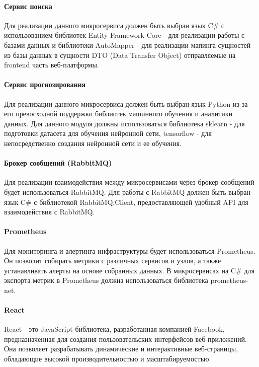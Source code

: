 \paragraph{Сервис поиска}

Для реализации данного микросервиса должен быть выбран язык C\# с использованием библиотек Entity Framework Core - для реализации работы с базами данных и библиотеки AutoMapper - для реализации мапинга сущностей из базы данных в сущности DTO (Data Transfer Object) отправляемые на frontend часть веб-платформы.

\paragraph{Сервис прогнозирования}

Для реализации данного микросервиса должен быть выбран язык Python из-за его превосходной поддержки библиотек машинного обучения и аналитики данных. Для данного модуля должны использоваться библиотека sklearn - для подготовки датасета для обучения нейронной сети, tensorflow - для непосредственно создания нейронной сети и ее обучения.

\paragraph{Брокер сообщений (RabbitMQ)}

Для реализации взаимодействия между микросервисами через брокер сообщений будет использоваться RabbitMQ. Для работы с RabbitMQ должен быть выбран язык C\# с библиотекой RabbitMQ.Client, предоставляющей удобный API для взаимодействия с RabbitMQ.

\paragraph{Prometheus}

Для мониторинга и алертинга инфраструктуры будет использоваться Prometheus. Он позволит собирать метрики с различных сервисов и узлов, а также устанавливать алерты на основе собранных данных. В микросервисах на C\# для экспорта метрик в Prometheus должна использоваться библиотека prometheus-net.

\paragraph{React}

React - это JavaScript библиотека, разработанная компанией Facebook, предназначенная для создания пользовательских интерфейсов веб-приложений. Она позволяет разрабатывать динамические и интерактивные веб-страницы, обладающие высокой производительностью и масштабируемостью.

